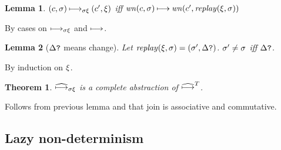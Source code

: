 \documentclass[preprint,onecolumn,9pt]{sigplanconf} %
\newtheorem{theorem}{Theorem}
\newtheorem{lemma}{Lemma}
\begin{document}
\begin{lemma}
$(c, \sigma) \mathbin{\longmapsto_{\mathit{\sigma\xi}}} (c', \xi)$ iff
$\mathit{wn}(c,\sigma) \mathbin{\longmapsto} \mathit{wn}(c',\mathit{replay}(\xi,\sigma))$
\end{lemma}
By cases on $\mathbin{\longmapsto_{\mathit{\sigma\xi}}}$ and $\mathbin{\longmapsto}$.

\begin{lemma}[$\Delta\mbox{{\tt ?}}$ means change]
Let $\mathit{replay}(\xi,\sigma) = (\sigma', \Delta\mbox{{\tt ?}})$. $\sigma' \neq \sigma$ iff $\Delta\mbox{{\tt ?}}$.
\end{lemma}
By induction on $\xi$.

\begin{theorem}
$\mathbin{\widehat{\longmapsto}_{\mathit{\sigma\xi}}}$ is a complete abstraction of $\widehat{\mathbin{\longmapsto}}^T$.
\end{theorem}
Follows from previous lemma and that join is associative and commutative.





\subsection{Lazy non-determinism}
\end{document}
